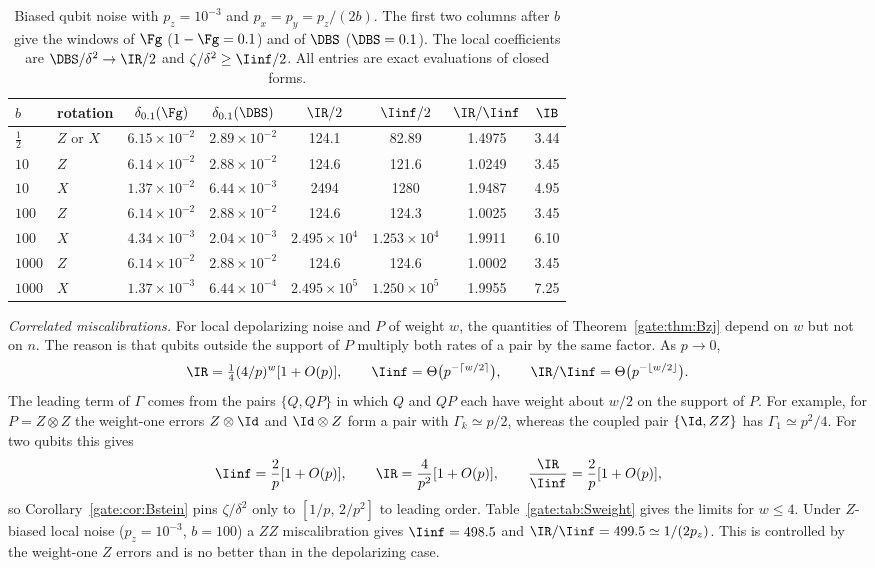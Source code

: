 \begin{table}[!tbp]
\centering
\caption{Biased qubit noise with $p_z=10^{-3}$ and $p_x=p_y=p_z/(2b)$. The first two columns after $b$ give the windows of $\Fg$ ($1-\Fg=0.1$) and of $\DBS$ ($\DBS=0.1$). The local coefficients are $\DBS/\delta^2\to\IR/2$ and $\zeta/\delta^2\ge\Iinf/2$. All entries are exact evaluations of closed forms.}
\label{gate:tab:Sbiased}
\small
\begin{tabular}{llcccccc}
\toprule
$b$ & rotation & $\delta_{0.1}(\Fg)$ & $\delta_{0.1}(\DBS)$ & $\IR/2$ & $\Iinf/2$ & $\IR/\Iinf$ & $\IB$\\
\midrule
$\frac12$ & $Z$ or $X$ & $6.15\times10^{-2}$ & $2.89\times10^{-2}$ & 124.1 & 82.89 & 1.4975 & 3.44\\
$10$ & $Z$ & $6.14\times10^{-2}$ & $2.88\times10^{-2}$ & 124.6 & 121.6 & 1.0249 & 3.45\\
$10$ & $X$ & $1.37\times10^{-2}$ & $6.44\times10^{-3}$ & 2494 & 1280 & 1.9487 & 4.95\\
$100$ & $Z$ & $6.14\times10^{-2}$ & $2.88\times10^{-2}$ & 124.6 & 124.3 & 1.0025 & 3.45\\
$100$ & $X$ & $4.34\times10^{-3}$ & $2.04\times10^{-3}$ & $2.495\times10^{4}$ & $1.253\times10^{4}$ & 1.9911 & 6.10\\
$1000$ & $Z$ & $6.14\times10^{-2}$ & $2.88\times10^{-2}$ & 124.6 & 124.6 & 1.0002 & 3.45\\
$1000$ & $X$ & $1.37\times10^{-3}$ & $6.44\times10^{-4}$ & $2.495\times10^{5}$ & $1.250\times10^{5}$ & 1.9955 & 7.25\\
\bottomrule
\end{tabular}
\end{table}

\emph{Correlated miscalibrations.} For local depolarizing noise and $P$ of weight $w$, the quantities of Theorem~\ref{gate:thm:Bzj} depend on $w$ but not on $n$. The reason is that qubits outside the support of $P$ multiply both rates of a pair by the same factor. As $p\to0$,
\begin{equation}\label{gate:eq:Bweight}
\IR=\tfrac14(4/p)^w[1+O(p)],\qquad \Iinf=\Theta\big(p^{-\lceil w/2\rceil}\big),\qquad \IR/\Iinf=\Theta\big(p^{-\lfloor w/2\rfloor}\big).
\end{equation}
The leading term of $\Gamma$ comes from the pairs $\{Q,QP\}$ in which $Q$ and $QP$ each have weight about $w/2$ on the support of $P$. For example, for $P=Z\otimes Z$ the weight-one errors $Z\otimes\Id$ and $\Id\otimes Z$ form a pair with $\Gamma_k\simeq p/2$, whereas the coupled pair $\{\Id,ZZ\}$ has $\Gamma_1\simeq p^2/4$. For two qubits this gives
\begin{equation}\label{gate:eq:BZZ}
\Iinf=\frac2p[1+O(p)],\qquad \IR=\frac4{p^2}[1+O(p)],\qquad \frac{\IR}{\Iinf}=\frac2p[1+O(p)],
\end{equation}
so Corollary~\ref{gate:cor:Bstein} pins $\zeta/\delta^2$ only to $[1/p,\,2/p^2]$ to leading order. Table~\ref{gate:tab:Sweight} gives the limits for $w\le4$. Under $Z$-biased local noise ($p_z=10^{-3}$, $b=100$) a $ZZ$ miscalibration gives $\Iinf=498.5$ and $\IR/\Iinf=499.5\simeq1/(2p_z)$. This is controlled by the weight-one $Z$ errors and is no better than in the depolarizing case.

